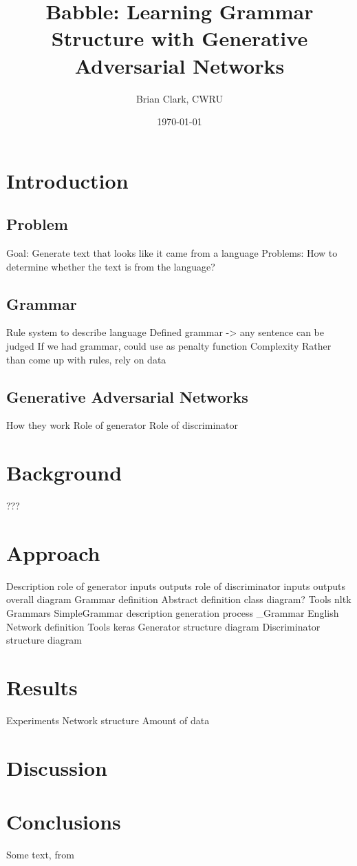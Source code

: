 \documentclass{article}
\title{Babble: Learning Grammar Structure with Generative Adversarial Networks}
\author{Brian Clark, CWRU}
\date{\today}
\begin{document}
\maketitle
\tableofcontents


\section{Introduction}

\subsection{Problem}
Goal: Generate text that looks like it came from a language
Problems: How to determine whether the text is from the language?

\subsection{Grammar}
    Rule system to describe language
    Defined grammar -> any sentence can be judged
    If we had grammar, could use as penalty function
    Complexity
    Rather than come up with rules, rely on data

\subsection{Generative Adversarial Networks}
    How they work
    Role of generator
    Role of discriminator

\section{Background}
    ???

\section{Approach}
    Description
        role of generator
            inputs
            outputs
        role of discriminator
            inputs
            outputs
        overall diagram
    Grammar definition
        Abstract definition
            class diagram?
        Tools
            nltk
        Grammars
            SimpleGrammar
                description
                generation process
            \_Grammar
            English
    Network definition
        Tools
            keras
        Generator structure
            diagram
        Discriminator structure
            diagram

\section{Results}
    Experiments
        Network structure
        Amount of data

\section{Discussion}

\section{Conclusions}


Some text, from \cite{chollet2015keras}

{}

\end{document}

